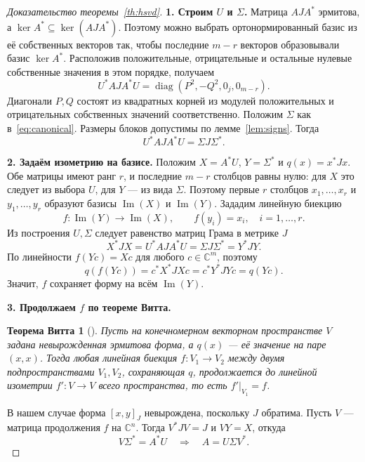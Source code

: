 \documentclass[a4paper,12pt]{article}
\DeclareMathOperator{\diag}{diag}
\theoremstyle{csstyle}
\DeclareMathOperator{\im}{Im}
\newcommand{\HSVDComplex}{\mathbb C}
\newtheorem*{witt}{Теорема Витта}
\begin{document}
\begin{proof}[Доказательство теоремы~\ref{th:hsvd}]

\par\medskip{}
\noindent\textbf{1. Строим $U$ и $\Sigma$.}
Матрица $AJA^*$ эрмитова, а $\ker A^*\subseteq\ker(AJA^*)$.
Поэтому можно выбрать ортонормированный базис из её собственных векторов так,
чтобы последние $m-r$ векторов образовывали базис $\ker A^*$.
Расположив положительные, отрицательные и остальные нулевые
собственные значения в этом порядке, получаем
\[
U^*AJA^*U=\diag(P^2,-Q^2,0_j,0_{m-r}).
\]
Диагонали $P,Q$ состоят из квадратных корней из модулей
положительных и отрицательных собственных значений соответственно.
Положим $\Sigma$ как в~\eqref{eq:canonical}. Размеры блоков
допустимы по лемме~\ref{lem:signs}. Тогда
\[
U^*AJA^*U=\Sigma J\Sigma^*.
\]

\par\medskip{}
\noindent\textbf{2. Задаём изометрию на базисе.}
Положим $X=A^*U$, $Y=\Sigma^*$ и $q(x)=x^*Jx$.
Обе матрицы имеют ранг $r$, и последние $m-r$ столбцов равны нулю:
для $X$ это следует из выбора $U$, для $Y$ --- из вида $\Sigma$.
Поэтому первые $r$ столбцов $x_1,\ldots,x_r$ и $y_1,\ldots,y_r$
образуют базисы $\im(X)$ и $\im(Y)$.
Зададим линейную биекцию
\[
f:\im(Y)\longrightarrow\im(X),\qquad
f(y_i)=x_i,\quad i=1,\ldots,r.
\]
Из построения $U,\Sigma$ следует равенство матриц Грама в метрике $J$
\begin{equation}\label{eq:equal-grams}
X^*JX=U^*AJA^*U=\Sigma J\Sigma^*=Y^*JY.
\end{equation}
По линейности $f(Yc)=Xc$ для любого $c\in\HSVDComplex^m$, поэтому
\[
q(f(Yc))=c^*X^*JXc=c^*Y^*JYc=q(Yc).
\]
Значит, $f$ сохраняет форму на всём $\im(Y)$.

\par\medskip{}
\noindent\textbf{3. Продолжаем $f$ по теореме Витта.}
\begin{witt}[\cite{WittHermitian}]
Пусть на конечномерном векторном пространстве $V$ задана невырожденная эрмитова форма, а $q(x)$ --- её значение на паре $(x,x)$.
Тогда любая линейная биекция $f: V_1 \to V_2$ между двумя подпространствами $V_1, V_2$,
сохраняющая $q$, продолжается до линейной изометрии $f':V \to V$ всего пространства, то есть $f'|_{V_1} = f$.
\end{witt}

В нашем случае форма $[x,y]_J$ невырождена, поскольку $J$ обратима.
Пусть $V$ --- матрица продолжения $f$ на $\HSVDComplex^n$.
Тогда $V^*JV=J$ и $VY=X$, откуда
\[
V\Sigma^*=A^*U
\quad\Longrightarrow\quad
A=U\Sigma V^*.
\]
\end{proof}
\end{document}
